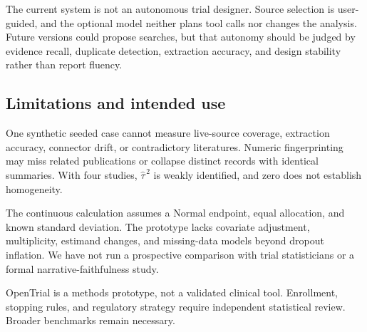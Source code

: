 \documentclass{article}
\begin{document}
The current system is not an autonomous trial designer. Source selection is user-guided, and the optional model neither plans tool calls nor changes the analysis. Future versions could propose searches, but that autonomy should be judged by evidence recall, duplicate detection, extraction accuracy, and design stability rather than report fluency.

\subsection{Limitations and intended use}

One synthetic seeded case cannot measure live-source coverage, extraction accuracy, connector drift, or contradictory literatures. Numeric fingerprinting may miss related publications or collapse distinct records with identical summaries. With four studies, \(\widehat{\tau}^{\,2}\) is weakly identified, and zero does not establish homogeneity.

The continuous calculation assumes a Normal endpoint, equal allocation, and known standard deviation. The prototype lacks covariate adjustment, multiplicity, estimand changes, and missing-data models beyond dropout inflation. We have not run a prospective comparison with trial statisticians or a formal narrative-faithfulness study.

OpenTrial is a methods prototype, not a validated clinical tool. Enrollment, stopping rules, and regulatory strategy require independent statistical review. Broader benchmarks remain necessary.

\clearpage


\end{document}
